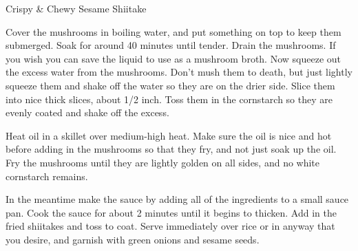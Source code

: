 \begin{recipe}{Crispy \& Chewy Sesame Shiitake}

    \begin{ingredients}
    \end{ingredients}

    \begin{instructions}
        Cover the mushrooms in boiling water, and put something on top to keep them submerged. Soak for around 40 minutes until tender. Drain the mushrooms. If you wish you can save the liquid to use as a mushroom broth. Now squeeze out the excess water from the mushrooms. Don’t mush them to death, but just lightly squeeze them and shake off the water so they are on the drier side. Slice them into nice thick slices, about 1/2 inch. Toss them in the cornstarch so they are evenly coated and shake off the excess.

        Heat oil in a skillet over medium-high heat. Make sure the oil is nice and hot before adding in the mushrooms so that they fry, and not just soak up the oil. Fry the mushrooms until they are lightly golden on all sides, and no white cornstarch remains.

        In the meantime make the sauce by adding all of the ingredients to a small sauce pan. Cook the sauce for about 2 minutes until it begins to thicken. Add in the fried shiitakes and toss to coat. Serve immediately over rice or in anyway that you desire, and garnish with green onions and sesame seeds.
    \end{instructions}
\end{recipe}
